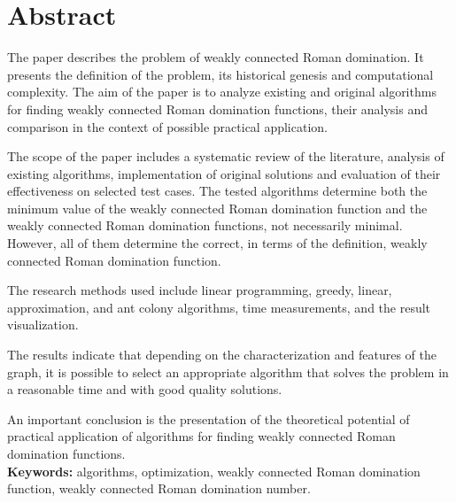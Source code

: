 \chapter*{Abstract}
The paper describes the problem of weakly connected Roman domination. It presents the definition of the problem, its historical genesis and computational complexity. The aim of the paper is to analyze existing and original algorithms for finding weakly connected Roman domination functions, their analysis and comparison in the context of possible practical application.

The scope of the paper includes a systematic review of the literature, analysis of existing algorithms, implementation of original solutions and evaluation of their effectiveness on selected test cases. The tested algorithms determine both the minimum value of the weakly connected Roman domination function and the weakly connected Roman domination functions, not necessarily minimal. However, all of them determine the correct, in terms of the definition, weakly connected Roman domination function.

The research methods used include linear programming, greedy, linear, approximation, and ant colony algorithms, time measurements, and the result visualization.

The results indicate that depending on the characterization and features of the graph, it is possible to select an appropriate algorithm that solves the problem in a reasonable time and with good quality solutions.

An important conclusion is the presentation of the theoretical potential of practical application of algorithms for finding weakly connected Roman domination functions.\\

\textbf{Keywords:} algorithms, optimization, weakly connected Roman domination function, weakly connected Roman domination number.
